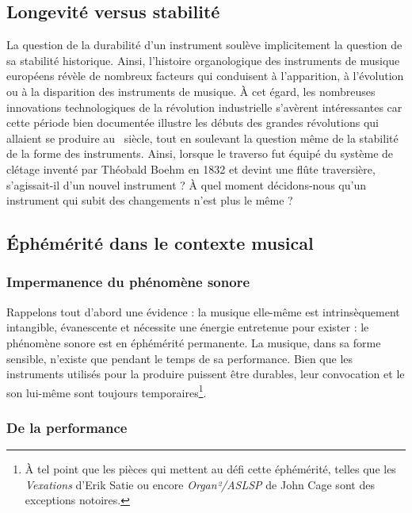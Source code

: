 \subsection{Longevité versus stabilité}
\label{sec:ephemeral:longevity_stability}

\noindent La question de la durabilité d'un instrument soulève implicitement la question de sa stabilité historique. Ainsi, l'histoire organologique des instruments de musique européens révèle de nombreux facteurs qui conduisent à l'apparition, à l'évolution ou à la disparition des instruments de musique. À cet égard, les nombreuses innovations technologiques de la révolution industrielle s'avèrent intéressantes car cette période bien documentée illustre les débuts des grandes révolutions qui allaient se produire au ~siècle, tout en soulevant la question même de la stabilité de la forme des instruments. Ainsi, lorsque le traverso fut équipé du système de clétage inventé par Théobald Boehm en 1832 et devint une flûte traversière, s'agissait-il d'un nouvel instrument ? À quel moment décidons-nous qu'un instrument qui subit des changements n'est plus le même ?

\subsection{Éphémérité dans le contexte musical}
\label{sec:ephemeral:ephemerality_in_musical_context}

\subsubsection{Impermanence du phénomène sonore}
\noindent Rappelons tout d'abord une évidence : la musique elle-même est intrinsèquement intangible, évanescente et nécessite une énergie entretenue pour exister : le phénomène sonore est en éphémérité permanente. La musique, dans sa forme sensible, n'existe que pendant le temps de sa performance. Bien que les instruments utilisés pour la produire puissent être durables, leur convocation et le son lui-même sont toujours temporaires\footnote{À tel point que les pièces qui mettent au défi cette éphémérité, telles que les \textit{Vexations} d'Erik Satie ou encore \textit{Organ²/ASLSP} de John Cage sont des exceptions notoires.}.

\subsubsection{De la performance}

